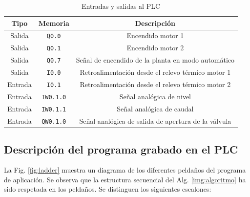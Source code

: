 \begin{table}[!t]
\renewcommand{\arraystretch}{1.3}
\centering
\begin{tabular}{c||c||c}
\hline
\bfseries Tipo & \bfseries Memoria & \bfseries Descripción\\
\hline \hline
Salida & \verb|Q0.0|  & Encendido motor 1\\
Salida & \verb|Q0.1|  & Encendido motor 2\\
Salida & \verb|Q0.7|  & Señal de encendido de la planta en modo automático\\
Salida & \verb|I0.0|  & Retroalimentación desde el relevo térmico motor 1\\
\hline
Entrada & \verb|I0.1|  & Retroalimentación desde el relevo térmico motor 2\\
Entrada & \verb|IW0.1.0|  & Señal analógica de nivel\\
Entrada & \verb|IW0.1.1|  & Señal analógica de caudal \\
Entrada & \verb|QW0.1.0|  & Señal analógica de salida de apertura de la válvula
\\
\hline
\end{tabular}
\caption{Entradas y salidas al PLC}
\label{table:entradassalidas}
\end{table}

\subsection{Descripción del programa grabado en el PLC}

La Fig. \ref{fig:ladder} muestra un diagrama de los diferentes peldaños del
programa de aplicación.
Se observa que la estructura secuencial del Alg. \ref{img:algoritmo} ha
sido respetada en los peldaños.
Se distinguen los siguientes escalones:


